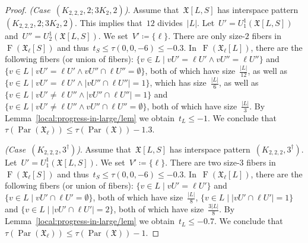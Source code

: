 \documentclass[english,a4paper]{article}
\theoremstyle{plain}
\theoremstyle{definition}
\newcommand{\abs}[1]{| #1 |}
\DeclareMathOperator{\Fibers}{F}
\newcommand{\coherentConfig}{\ensuremath{\mathfrak{X}}}
\newcommand{\fibers}[1]{\ensuremath{\Fibers \left( #1 \right)}}
\newcommand{\interspace}[2]{\ensuremath{\coherentConfig[#1,#2]}}
\DeclareMathOperator{\parameters}{Par}
\newcommand{\ipsixMatchingAndComplement}{\ensuremath{(\clique{2,2,2},2;\disjointCliques{3}{2},2)}}
\newcommand{\ipsixMatchingComplement} {\ensuremath{(\clique{2,2,2},3^\dag)}}
\newcommand{\clique}[1]{\ensuremath{K_{#1}}}
\newcommand{\disjointCliques}[2]{\ensuremath{#1 \clique{#2}}}
\begin{document}
\begin{proof}
    \textit{(Case~$\ipsixMatchingAndComplement$)}.
    Assume that~$\interspace{L}{S}$ has interspace pattern~$\ipsixMatchingAndComplement$.
    This implies that~$12$ divides~$|L|$.
    Let~$U' = U^1_1(\interspace{L}{S})$ and~$U'' = U^1_2(\interspace{L}{S})$.
    We set~$V' \coloneqq \{\ell\}$.
    There are only size-$2$ fibers in~$\fibers{\coherentConfig_\ell[S]}$ and thus~$t_S \leq \tau(0,0,-6) \leq -0.3$.
    In~$\fibers{\coherentConfig_\ell[L]}$, there are the following fibers (or union of fibers):
    $\{v \in L \mid vU' = \ell U'\wedge v U'' = \ell U''\}$ and
    $\{v \in L \mid vU' = \ell U'\wedge v U '' \cap \ell U'' = \emptyset\}$, both of which have size~$\frac{\abs{L}}{12}$, as well as
    $\{v \in L \mid vU' = \ell U'\wedge \abs{v U'' \cap \ell U''} = 1\}$, which has size~$\frac{\abs{L}}{6}$, as well as
    $\{v \in L \mid vU' \neq \ell U''\wedge \abs{v U'' \cap \ell U''} = 1\}$ and
    $\{v \in L \mid vU' \neq \ell U''\wedge v U'' \cap \ell U'' = \emptyset\}$, both of which have size~$\frac{|L|}{3}$.
    By Lemma~\ref{local:progress-in-large/lem} we obtain~$t_L \leq -1$.
    We conclude that~$\tau(\parameters(\coherentConfig_\ell)) \leq \tau(\parameters(\coherentConfig))- 1.3$.


    \textit{(Case~$\ipsixMatchingComplement$)}.
    Assume that~$\interspace{L}{S}$ has interspace pattern~$\ipsixMatchingComplement$.
    Let~$U' = U^1_1(\interspace{L}{S})$.
    We set~$V' \coloneqq \{\ell\}$.
    There are two size-$3$ fibers in~$\fibers{\coherentConfig_\ell[S]}$  and thus~$t_S \leq \tau(0,0,-6) \leq -0.3$.
    In~$\fibers{\coherentConfig_\ell[L]}$, there are the following fibers (or union of fibers):
    $\{v \in L \mid vU' = \ell U'\}$ and
    $\{v \in L \mid vU' \cap \ell U' = \emptyset\}$, both of which have size~$\frac{\abs{L}}{8}$,
    $\{v \in L \mid \abs{vU' \cap \ell U'} = 1\}$ and
    $\{v \in L \mid \abs{vU' \cap \ell U'} = 2\}$, both of which have size~$\frac{3\abs{L}}{8}$.
    By Lemma~\ref{local:progress-in-large/lem} we obtain~$t_L \leq -0.7$.
    We conclude that~$\tau(\parameters(\coherentConfig_\ell)) \leq \tau(\parameters(\coherentConfig))- 1$.



\end{proof}
\end{document}
